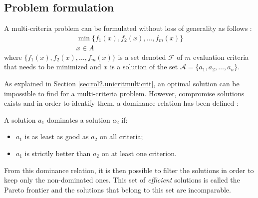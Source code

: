 
\subsection{Problem formulation}
A multi-criteria problem can be formulated without loss of generality as follows \cite{BraMar2002}:
\begin{equation}
\begin{gathered}
\min \{f_1(x), f_2(x), \dots, f_m(x)\}\\
x \in A
\end{gathered}
\end{equation}
where $\{f_1(x), f_2(x), \dots, f_m(x)\}$ is a set denoted $\mathcal{F}$ of $m$ evaluation criteria that needs to be minimized and $x$ is a solution of the set $\mathcal{A} = \{a_1, a_2, \dots, a_n\}$.

As explained in Section \ref{sec:rol2.unicritmulticrit}, an optimal solution can be impossible to find for a multi-criteria problem. However, compromise solutions exists and in order to identify them, a dominance relation has been defined \cite{BraMar2002}:

\begin{definition}[Dominance]
A solution $a_1$ dominates a solution $a_2$ if:
\begin{itemize}
\item $a_1$ is as least as good as $a_2$ on all criteria;
\item $a_1$ is strictly better than $a_2$ on at least one criterion.
\end{itemize}
\end{definition}

From this dominance relation, it is then possible to filter the solutions in order to keep only the non-dominated ones. This set of \emph{efficient} solutions is called the Pareto frontier and the solutions that belong to this set are incomparable.

